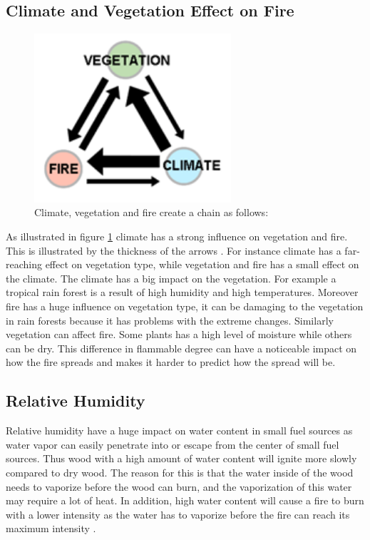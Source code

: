 \subsection{Climate and Vegetation Effect on Fire}
\begin{figure}[here]
  \centering
      \includegraphics[width=0.65\textwidth]{theory/graphics/fire-climate.png}
  \caption{Climate, vegetation and fire create a chain as follows: \cite{firetypeimage} }
  \label{fig:fire-climate}
\end{figure}
As illustrated in figure \ref{fig:fire-climate} climate has a strong influence on vegetation and fire. This is illustrated by the thickness of the arrows . For instance climate has a far-reaching effect on vegetation type, while vegetation and fire has a small effect on the climate. The climate has a big impact on the vegetation. For example a tropical rain forest is a result of high humidity and high temperatures. Moreover fire has a huge influence on vegetation type, it can be damaging to the vegetation in rain forests because it has problems with the extreme changes. Similarly vegetation can affect fire. Some plants has a high level of moisture while others can be dry. This difference in flammable degree can have a noticeable impact on how the fire spreads and makes it harder to predict how the spread will be\cite{firetypeimage}.
\subsection{Relative Humidity}
Relative humidity have a huge impact on water content in small fuel sources as water vapor can easily penetrate into or escape from the center of small fuel sources. Thus wood with a high amount of water content will ignite more slowly compared to dry wood. The reason for this is that the water inside of the wood needs to vaporize before the wood can burn, and the vaporization of this water may require a lot of heat. In addition, high water content will cause a fire to burn with a lower intensity as the water has to vaporize before the fire can reach its maximum intensity \cite{relvhum}.
